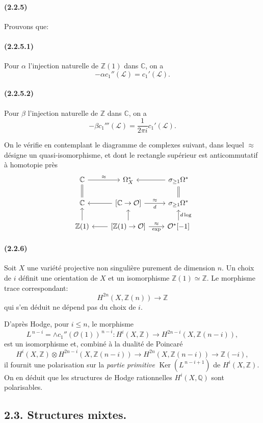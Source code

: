 \documentclass[10pt]{article}
\newcommand{\C}{\mathbb C}
\newcommand{\Q}{\mathbb Q}
\newcommand{\Z}{\mathbb Z}
\newcommand{\Ker}{\operatorname{Ker}}
\providecommand{\cO}{\mathcal O}
\providecommand{\cL}{\mathcal L}
\providecommand{\cO}{\mathcal O}
\providecommand{\cL}{\mathcal L}
\newcommand{\dlog}{d\log}
\begin{document}
\paragraph{(2.2.5)} Prouvons que:
\paragraph{(2.2.5.1)} Pour $\alpha$ l'injection naturelle de $\Z(1)$ dans $\C$, on a
\[
-\alpha c_1''(\cL)=c_1'(\cL).
\]
\paragraph{(2.2.5.2)} Pour $\beta$ l'injection naturelle de $\Z$ dans $\C$, on a
\[
-\beta c_1'''(\cL)=\frac{1}{2\pi i}c_1'(\cL).
\]

On le vérifie en contemplant le diagramme de complexes suivant, dans lequel $\approx$ désigne un quasi-isomorphisme, et dont le rectangle supérieur est anticommutatif à homotopie près
\[
\begin{tikzcd}[column sep=2.2em,row sep=1.5em]
\C \arrow[r,"\approx"] \arrow[d,equal] & \Omega_X^* & \sigma_{\ge1}\Omega^* \arrow[l] \arrow[d,equal]\\
\C & {[\C\to\cO]} \arrow[l] \arrow[r,"\approx","d"'] & \sigma_{\ge1}\Omega^*\\
\Z(1) \arrow[u] & {[\Z(1)\to\cO]} \arrow[l] \arrow[r,"\approx","{\exp}"'] \arrow[u] & \cO^*[-1] \arrow[u,"\dlog"']
\end{tikzcd}
\]

\paragraph{(2.2.6)} Soit $X$ une variété projective non singulière purement de dimension $n$. Un choix de $i$ définit une orientation de $X$ et un isomorphisme $\Z(1)\simeq\Z$. Le morphisme trace correspondant:
\[
H^{2n}(X,\Z(n))\longrightarrow \Z
\]
qui s'en déduit ne dépend pas du choix de $i$.

D'après Hodge, pour $i\le n$, le morphisme
\[
L^{\,n-i}=\wedge c_1''(\cO(1))^{\,n-i}:H^i(X,\Z)\longrightarrow H^{2n-i}(X,\Z(n-i)),
\]
est un isomorphisme et, combiné à la dualité de Poincaré
\[
H^i(X,\Z)\otimes H^{2n-i}(X,\Z(n-i))\longrightarrow
H^{2n}(X,\Z(n-i))\longrightarrow \Z(-i),
\]
il fournit une polarisation sur la \emph{partie primitive} $\Ker(L^{\,n-i+1})$ de $H^i(X,\Z)$. On en déduit que les structures de Hodge rationnelles $H^i(X,\Q)$ sont polarisables.

\subsection*{2.3. Structures mixtes.}
\end{document}
